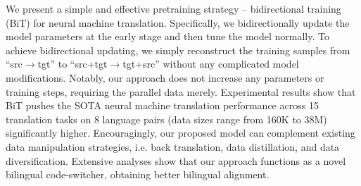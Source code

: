 We present a simple and effective pretraining strategy -- bidirectional training (BiT) for neural machine translation. Specifically, we bidirectionally update the model parameters at the early stage and then tune the model normally. To achieve bidirectional updating, we simply reconstruct the training samples from ``src$\rightarrow$tgt'' to  ``src+tgt$\rightarrow$tgt+src'' without any complicated model modifications.  Notably, our approach does not increase any parameters or training steps, requiring the parallel data merely. Experimental results show that BiT pushes the SOTA neural machine translation performance across 15 translation tasks on 8 language pairs (data sizes range from 160K to 38M) significantly higher. Encouragingly, our proposed model can complement existing data manipulation strategies, i.e. back translation, data distillation, and data diversification. Extensive analyses show that our approach functions as a novel bilingual code-switcher, obtaining better bilingual alignment.
